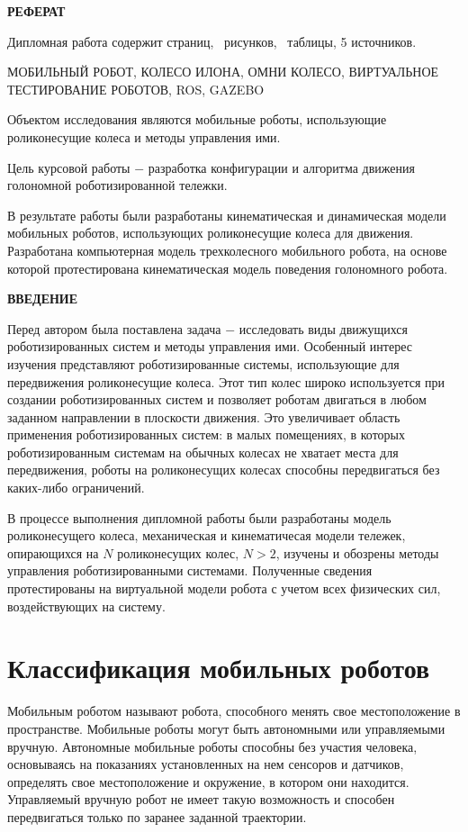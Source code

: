 \documentclass[oneside,final,14pt]{extreport}
\providecommand\totfig{}
\providecommand\tottab{}
\begin{document}
\begin{center}
\bfseries РЕФЕРАТ
\end{center}

Дипломная работа содержит \pageref{LastPage} страниц, \totfig\ рисунков, \tottab\ таблицы, 5 источников.

МОБИЛЬНЫЙ РОБОТ, КОЛЕСО ИЛОНА, ОМНИ КОЛЕСО, ВИРТУАЛЬНОЕ ТЕСТИРОВАНИЕ РОБОТОВ, ROS, GAZEBO

Объектом исследования являются мобильные роботы, использующие роликонесущие колеса и методы управления ими.

Цель курсовой работы $-$ разработка конфигурации и алгоритма движения голономной роботизированной тележки.

В результате работы были разработаны кинематическая и динамическая модели мобильных роботов, использующих роликонесущие колеса для движения. Разработана компьютерная модель трехколесного мобильного робота, на основе которой протестирована кинематическая модель поведения голономного робота.

\tableofcontents
\newpage
\begin{center}
\bfseries ВВЕДЕНИЕ
\end{center}

Перед автором была поставлена задача $-$ исследовать виды движущихся роботизированных систем и методы управления ими. Особенный интерес изучения представляют роботизированные системы, использующие для передвижения роликонесущие колеса. Этот тип колес широко используется при создании роботизированных систем и позволяет роботам двигаться в любом заданном направлении в плоскости движения. Это увеличивает область применения роботизированных систем: в малых помещениях, в которых роботизированным системам на обычных колесах не хватает места для передвижения, роботы на роликонесущих колесах способны передвигаться без каких-либо ограничений. 

В процессе выполнения дипломной работы были разработаны модель роликонесущего колеса, механическая и кинематичесая модели тележек, опирающихся на $N$ роликонесущих колес, $N>2$, изучены и обозрены методы управления роботизированными системами. Полученные сведения протестированы на виртуальной модели робота с учетом всех физических сил, воздействующих на систему.

\chapter{Классификация мобильных роботов}
Мобильным роботом называют робота, способного менять свое местоположение в пространстве. Мобильные роботы могут быть автономными или управляемыми вручную. Автономные мобильные роботы способны без участия человека, основываясь на показаниях установленных на нем сенсоров и датчиков, определять свое местоположение и окружение, в котором они находится. Управляемый вручную робот не имеет такую возможность и способен передвигаться только по заранее заданной траектории.
\end{document}
